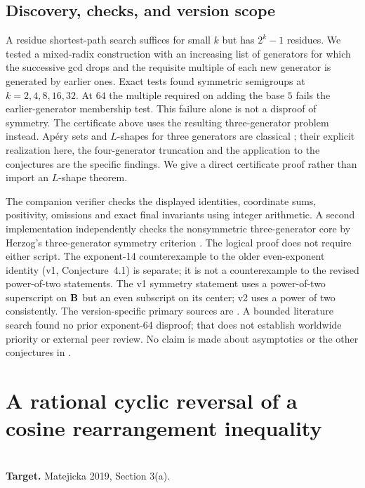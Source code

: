 \documentclass[11pt,a4paper]{article}
\begin{document}
\subsection{Discovery, checks, and version scope}
A residue shortest-path search suffices for small $k$ but has $2^k-1$ residues. We tested a mixed-radix construction with an increasing list of generators for which the successive gcd drops and the requisite multiple of each new generator is generated by earlier ones. Exact tests found symmetric semigroups at $k=2,4,8,16,32$. At $64$ the multiple required on adding the base $5$ fails the earlier-generator membership test. This failure alone is not a disproof of symmetry. The certificate above uses the resulting three-generator problem instead. Ap\'ery sets and $L$-shapes for three generators are classical \cite{R12T:AgMar}; their explicit realization here, the four-generator truncation and the application to the conjectures are the specific findings. We give a direct certificate proof rather than import an $L$-shape theorem.

The companion verifier checks the displayed identities, coordinate sums, positivity, omissions and exact final invariants using integer arithmetic. A second implementation independently checks the nonsymmetric three-generator core by Herzog's three-generator symmetry criterion \cite{R12T:Herzog}. The logical proof does not require either script. The exponent-14 counterexample to the older even-exponent identity (v1, Conjecture~4.1) is separate; it is not a counterexample to the revised power-of-two statements. The v1 symmetry statement uses a power-of-two superscript on $\mathbf B$ but an even subscript on its center; v2 uses a power of two consistently. The version-specific primary sources are \cite{R12T:BL1,R12T:BL2}. A bounded literature search found no prior exponent-64 disproof; that does not establish worldwide priority or external peer review. No claim is made about asymptotics or the other conjectures in \cite{R12T:BL2}.
\endgroup


\clearpage

\section{A rational cyclic reversal of a cosine rearrangement inequality}
\label{section:R22M}
\\[3pt]
\noindent\textbf{Target.} Matejicka 2019, Section 3(a).
\end{document}
